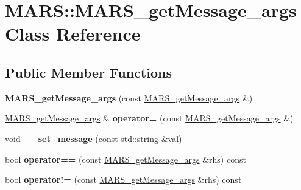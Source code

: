 \hypertarget{classMARS_1_1MARS__getMessage__args}{}\section{M\+A\+RS\+:\+:M\+A\+R\+S\+\_\+get\+Message\+\_\+args Class Reference}
\label{classMARS_1_1MARS__getMessage__args}
\subsection*{Public Member Functions}
\begin{DoxyCompactItemize}
\item 
\mbox{\label{classMARS_1_1MARS__getMessage__args_a4356f7af49401852ba8444ec96155bcd}} 
{\bfseries M\+A\+R\+S\+\_\+get\+Message\+\_\+args} (const \hyperlink{classMARS_1_1MARS__getMessage__args}{M\+A\+R\+S\+\_\+get\+Message\+\_\+args} \&)
\item 
\mbox{\label{classMARS_1_1MARS__getMessage__args_ab20c3fee80dd01c8532859344be116f8}} 
\hyperlink{classMARS_1_1MARS__getMessage__args}{M\+A\+R\+S\+\_\+get\+Message\+\_\+args} \& {\bfseries operator=} (const \hyperlink{classMARS_1_1MARS__getMessage__args}{M\+A\+R\+S\+\_\+get\+Message\+\_\+args} \&)
\item 
\mbox{\label{classMARS_1_1MARS__getMessage__args_a020731a2c36ff976198c9d63db6094f8}} 
void {\bfseries \+\_\+\+\_\+set\+\_\+message} (const std\+::string \&val)
\item 
\mbox{\label{classMARS_1_1MARS__getMessage__args_a9d556a6becac3ce1d146d3dd7b576a9d}} 
bool {\bfseries operator==} (const \hyperlink{classMARS_1_1MARS__getMessage__args}{M\+A\+R\+S\+\_\+get\+Message\+\_\+args} \&rhs) const
\item 
\mbox{\label{classMARS_1_1MARS__getMessage__args_aad5327644123e73e9588912301db109c}} 
bool {\bfseries operator!=} (const \hyperlink{classMARS_1_1MARS__getMessage__args}{M\+A\+R\+S\+\_\+get\+Message\+\_\+args} \&rhs) const
\item 
\mbox{\label{classMARS_1_1MARS__getMessage__args_afe412a8ea0b5d5739ef707e9dffdcd41}} 

\end{DoxyCompactItemize}
